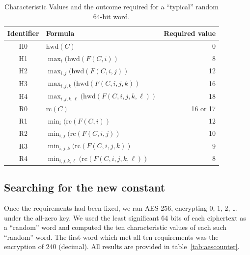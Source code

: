 \documentclass[11pt,twoside]{article}
\begin{document}
\begin{table}[htbp]
  \centering
  \begin{tabular}{c|lr}
    Identifier & Formula & Required value \\
\hline
    H0 & $\mbox{hwd}(C)$ & 0\\
    H1 & $\max_i(\mbox{hwd}(F(C,i))$ & 8 \\
    H2 & $\max_{i,j}(\mbox{hwd}(F(C,i,j))$ & 12 \\
    H3 & $\max_{i,j,k}(\mbox{hwd}(F(C,i,j,k))$ & 16 \\
    H4 & $\max_{i,j,k,\ell}(\mbox{hwd}(F(C,i,j,k,\ell))$ & 18 \\
\hline
    R0 & $\mbox{rc}(C)$ & 16 or 17 \\
    R1 & $\min_i(\mbox{rc}(F(C,i))$ & 12\\
    R2 & $\min_{i,j}(\mbox{rc}(F(C,i,j))$ & 10 \\
    R3 & $\min_{i,j,k}(\mbox{rc}(F(C,i,j,k))$ & 9  \\
    R4 & $\min_{i,j,k,\ell}(\mbox{rc}(F(C,i,j,k,\ell))$ &8  \\
  \end{tabular}
  \caption{Characteristic Values and the outcome required for a ``typical''
    random 64-bit word.}
  \label{tab:characteristicvalues}
\end{table}


\subsection{Searching for the new constant}

Once the requirements had been fixed, we ran AES-256, encrypting 0, 1, 2, 
\ldots{} under the all-zero key. We used the least significant 64 bits of each
ciphertext as a ``random'' word and computed the ten characteristic values of
each such ``random'' word. The first word which met all ten requirements was 
the encryption of 240 (decimal). All results are provided in
table~\ref{tab:aescounter}. 


\newcommand{\Word}[1]{\texttt{#1}$\!\!\!$}
\end{document}
